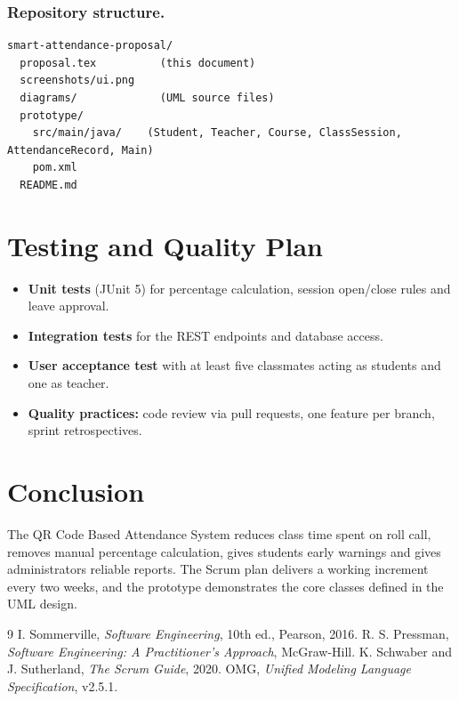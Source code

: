 \documentclass[11pt,a4paper]{article}
\newcommand{\proj}{QR Code Based Attendance System}
\begin{document}
\subsubsection*{Repository structure.}
\begin{lstlisting}[language={},numbers=none]
smart-attendance-proposal/
  proposal.tex          (this document)
  screenshots/ui.png
  diagrams/             (UML source files)
  prototype/
    src/main/java/    (Student, Teacher, Course, ClassSession, AttendanceRecord, Main)
    pom.xml
  README.md
\end{lstlisting}

\section{Testing and Quality Plan}
\begin{itemize}[noitemsep]
  \item \textbf{Unit tests} (JUnit 5) for percentage calculation, session open/close rules and leave approval.
  \item \textbf{Integration tests} for the REST endpoints and database access.
  \item \textbf{User acceptance test} with at least five classmates acting as students and one as teacher.
  \item \textbf{Quality practices:} code review via pull requests, one feature per branch, sprint retrospectives.
\end{itemize}

\section{Conclusion}
The \proj{} reduces class time spent on roll call, removes manual percentage calculation, gives students early
warnings and gives administrators reliable reports. The Scrum plan delivers a working increment every two weeks,
and the prototype demonstrates the core classes defined in the UML design.

\begin{thebibliography}{9}
 I. Sommerville, \textit{Software Engineering}, 10th ed., Pearson, 2016.
 R. S. Pressman, \textit{Software Engineering: A Practitioner's Approach}, McGraw-Hill.
 K. Schwaber and J. Sutherland, \textit{The Scrum Guide}, 2020.
 OMG, \textit{Unified Modeling Language Specification}, v2.5.1.
\end{thebibliography}
\end{document}
